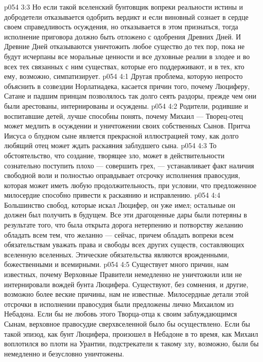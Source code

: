 \vs p054 3:3 Но если такой вселенский бунтовщик вопреки реальности истины и добродетели отказывается одобрить вердикт и если виновный сознает в сердце своем справедливость осуждения, но отказывается в этом признаться, тогда исполнение приговора должно быть отложено с одобрения Древних Дней. И Древние Дней отказываются уничтожить любое существо до тех пор, пока не будут исчерпаны все моральные ценности и все духовные реалии в злодее и во всех тех связанных с ним существах, которые его поддерживают, и в тех, кто ему, возможно, симпатизирует.
\vs p054 4:1 Другая проблема, которую непросто объяснить в созвездии Норлатиадека, касается причин того, почему Люциферу, Сатане и падшим принцам позволялось так долго сеять раздоры, прежде чем они были арестованы, интернированы и осуждены.
\vs p054 4:2 Родители, родившие и воспитавшие детей, лучше способны понять, почему Михаил --- Творец\hyp{}отец может медлить в осуждении и уничтожении своих собственных Сынов. Притча Иисуса о блудном сыне является прекрасной иллюстрацией тому, как долго любящий отец может ждать раскаяния заблудшего сына.
\vs p054 4:3 То обстоятельство, что создание, творящее зло, может в действительности сознательно поступить плохо --- совершить грех, --- устанавливает факт наличия свободной воли и полностью оправдывает отсрочку исполнения правосудия, которая может иметь любую продолжительность, при условии, что предложенное милосердие способно привести к раскаянию и исправлению.
\vs p054 4:4 \pc Большинство свобод, которые искал Люцифер, он уже имел; остальные он должен был получить в будущем. Все эти драгоценные дары были потеряны в результате того, что была открыта дорога нетерпению и потворству желанию обладать всем тем, что желанно --- сейчас, причем обладать вопреки всем обязательствам уважать права и свободы всех других существ, составляющих вселенную вселенных. Этические обязательства являются врожденными, божественными и всемирными.
\vs p054 4:5 \pc Существует много причин, нам известных, почему Верховные Правители немедленно не уничтожили или не интернировали вождей бунта Люцифера. Существуют, без сомнения, и другие, возможно более веские причины, нам не известные. Милосердные детали этой отсрочки в исполнении правосудия были предложены лично Михаилом из Небадона. Если бы не любовь этого Творца\hyp{}отца к своим заблуждающимся Сынам, верховное правосудие сверхвселенной было бы осуществлено. Если бы такой эпизод, как бунт Люцифера, произошел в Небадоне в то время, как Михаил воплотился во плоти на Урантии, подстрекатели к такому злу, возможно, были бы немедленно и безусловно уничтожены.
